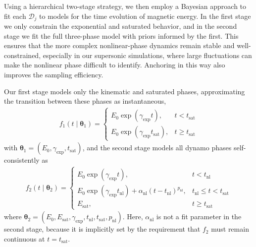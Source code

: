\documentclass[12pt,twoside]{extreport}
\newcommand{\mVector}[1]{\bm{#1}} %
\begin{document}
    Using a hierarchical two-stage strategy, we then employ a Bayesian approach to fit each $\mVector{\mathcal{D}}_j$ to models for the time evolution of magnetic energy. In the first stage we only constrain the exponential and saturated behavior, and in the second stage we fit the full three-phase model with priors informed by the first. This ensures that the more complex nonlinear-phase dynamics remain stable and well-constrained, especially in our supersonic simulations, where large fluctuations can make the nonlinear phase difficult to identify. Anchoring in this way also improves the sampling efficiency.

    Our first stage models only the kinematic and saturated phases, approximating the transition between these phases as instantaneous,
    \begin{align}
        f_1(t \mid \mVector{\theta}_1) =
            \begin{cases}
                E_0 \exp(\gamma_\mathrm{exp} t) , & t < t_\mathrm{sat} \\
                E_0 \exp(\gamma_\mathrm{exp} t_\mathrm{sat}) , & t \geq t_\mathrm{sat}
            \end{cases}
    \end{align}
    with $\mVector{\theta}_1 = (E_0, \gamma_\mathrm{exp}, t_\mathrm{sat})$, and the second stage models all dynamo phases self-consistently as
    \begin{align}
        f_2(t \mid \mVector{\theta}_2) =
            \begin{cases}
                E_0 \exp(\gamma_\mathrm{exp} t) , &
                    t < t_\mathrm{nl} \\
                E_0 \exp(\gamma_\mathrm{exp} t_\mathrm{nl})
                    + \alpha_\mathrm{nl} (t - t_\mathrm{nl})^{p_\mathrm{nl}} , & t_\mathrm{nl} \leq t < t_\mathrm{sat} \\
                E_\mathrm{sat} , &
                    t \geq t_\mathrm{sat}
            \end{cases} \label{eqn:integral_energy_model}
    \end{align}
    where $\mVector{\theta}_2 = (E_0, E_\mathrm{sat}, \gamma_\mathrm{exp}, t_\mathrm{nl}, t_\mathrm{sat}, p_\mathrm{nl})$. Here, $\alpha_\mathrm{nl}$ is not a fit parameter in the second stage, because it is implicitly set by the requirement that $f_2$ must remain continuous at $t = t_\mathrm{sat}$.
\end{document}
